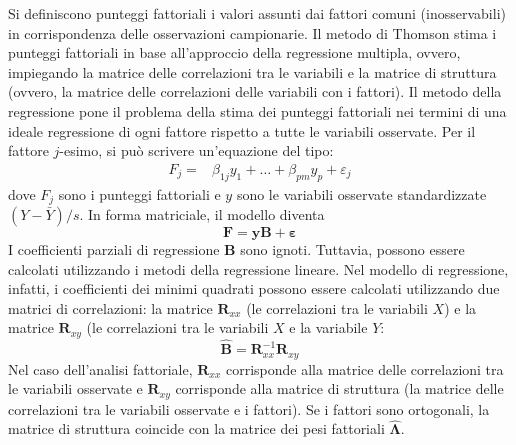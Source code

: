 Si definiscono punteggi fattoriali i valori assunti dai fattori comuni (inosservabili) in corrispondenza delle osservazioni campionarie. 
Il metodo di Thomson stima i punteggi fattoriali in base all'approccio della regressione multipla, ovvero, impiegando la matrice delle correlazioni tra le variabili e la matrice di struttura (ovvero, la matrice delle correlazioni delle variabili con i fattori). 
Il metodo della regressione pone il problema della stima dei punteggi fattoriali nei termini di una  ideale regressione di ogni fattore rispetto a tutte le variabili osservate. 
Per il fattore $j$-esimo, si può scrivere un'equazione del tipo:
\begin{align}
F_j =& \beta_{1j}y_1 + \dots + \beta_{pm}y_p + \varepsilon_j
\label{eq:punt_fatt}
\end{align}
dove $F_j$ sono i punteggi fattoriali e $y$ sono le variabili osservate
standardizzate $(Y-\bar{Y})/s$. In forma matriciale, il modello diventa
\begin{equation}
\boldsymbol{F} = \boldsymbol{y} \boldsymbol{B} +
\boldsymbol{\varepsilon}
\end{equation}
I coefficienti parziali di regressione \textbf{B} sono ignoti.
Tuttavia, possono essere calcolati utilizzando i metodi della
regressione lineare. Nel modello di regressione, infatti, i coefficienti dei minimi quadrati possono essere calcolati utilizzando due matrici di correlazioni: la
matrice $\textbf{R}_{xx}$ (le correlazioni tra le variabili $X$)  e  la matrice $\textbf{R}_{xy}$ (le correlazioni tra le variabili $X$ e la variabile $Y$:
\begin{equation}
\hat{\textbf{B}} = \textbf{R}_{xx}^{-1}\textbf{R}_{xy}
\label{eq:b_corr}
\end{equation}
Nel caso dell'analisi fattoriale, $\textbf{R}_{xx}$ corrisponde alla
matrice delle correlazioni tra le variabili osservate e
$\textbf{R}_{xy}$ corrisponde alla matrice di struttura (la matrice
delle correlazioni tra le variabili osservate e i fattori).
Se i fattori sono ortogonali, la matrice di struttura coincide con la
matrice dei pesi fattoriali $\hat{\boldsymbol{\Lambda}}$.

